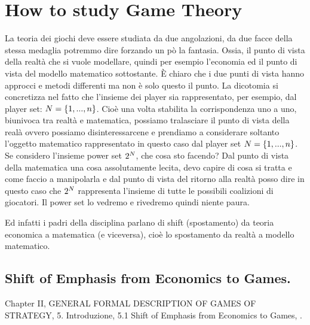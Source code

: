 \chapter{How to study Game Theory}
La teoria dei giochi deve essere studiata da due angolazioni, da due facce della stessa medaglia potremmo dire forzando un p\`o la fantasia. Ossia, il punto di vista della realt\`a che si vuole modellare, quindi per esempio l'economia ed il punto di vista del modello matematico sottostante. \`E chiaro che i due punti di vista hanno approcci e metodi differenti ma non \`e solo questo il punto. La dicotomia si concretizza nel fatto che l'insieme dei player sia rappresentato, per esempio, dal player set: $N = \{1, ..., n\}$. Cio\`e una volta stabilita la corrispondenza uno a uno, biunivoca tra realt\`a e matematica, possiamo tralasciare il punto di vista della real\`a ovvero possiamo disinteressarcene e prendiamo a considerare soltanto l'oggetto matematico rappresentato in questo caso dal player set $N = \{1, ..., n\}$. Se considero l'insieme power set $2^N$, che cosa sto facendo? Dal punto di vista della matematica una cosa assolutamente lecita, devo capire di cosa si tratta e come faccio a manipolarla e dal punto di vista del ritorno alla realt\`a posso dire in questo caso che $2^N$ rappresenta l'insieme di tutte le possibili coalizioni di giocatori. Il power set lo vedremo e rivedremo quindi niente paura.

Ed infatti i padri della disciplina parlano di shift (spostamento) da teoria economica a matematica (e viceversa), cio\`e lo spostamento da realt\`a a modello matematico.

\section{Shift of Emphasis from Economics to Games. \cite{vonNeumann1944}}
Chapter II, GENERAL FORMAL DESCRIPTION OF GAMES OF STRATEGY, 5. Introduzione, 5.1 Shift of Emphasis from Economics to Games, \cite{vonNeumann1944}.

